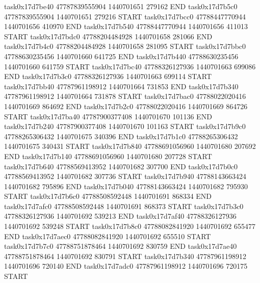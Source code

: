 task0x17d7be40 47787839555904          1440701651               279162  END
task0x17d7b5c0 47787839555904          1440701651               279216  START
task0x17d7bcc0 47788447770944          1440701656               410970  END
task0x17d7b540 47788447770944          1440701656               411013  START
task0x17d7bdc0 47788204484928          1440701658               281066  END
task0x17d7b4c0 47788204484928          1440701658               281095  START
task0x17d7bbc0 47788630235456          1440701660               641725  END
task0x17d7b440 47788630235456          1440701660               641759  START
task0x17d7bc40 47788326127936          1440701663               699086  END
task0x17d7b3c0 47788326127936          1440701663               699114  START
task0x17d7bb40 47787961198912          1440701664               731853  END
task0x17d7b340 47787961198912          1440701664               731878  START
task0x17d7bac0 47788022020416          1440701669               864692  END
task0x17d7b2c0 47788022020416          1440701669               864726  START
task0x17d7ba40 47787900377408          1440701670               101136  END
task0x17d7b240 47787900377408          1440701670               101163  START
task0x17d7b9c0 47788265306432          1440701675               340396  END
task0x17d7b1c0 47788265306432          1440701675               340431  START
task0x17d7b840 47788691056960          1440701680               207692  END
task0x17d7b140 47788691056960          1440701680               207728  START
task0x17d7b640 47788569413952          1440701682               307700  END
task0x17d7b0c0 47788569413952          1440701682               307736  START
task0x17d7b940 47788143663424          1440701682               795896  END
task0x17d7b040 47788143663424          1440701682               795930  START
task0x17d7b6c0 47788508592448          1440701691               868334  END
task0x17d7afc0 47788508592448          1440701691               868373  START
task0x17d7b3c0 47788326127936          1440701692               539213  END
task0x17d7af40 47788326127936          1440701692               539248  START
task0x17d7b8c0 47788082841920          1440701692               655477  END
task0x17d7aec0 47788082841920          1440701692               655510  START
task0x17d7b7c0 47788751878464          1440701692               830759  END
task0x17d7ae40 47788751878464          1440701692               830791  START
task0x17d7b340 47787961198912          1440701696               720140  END
task0x17d7adc0 47787961198912          1440701696               720175  START
